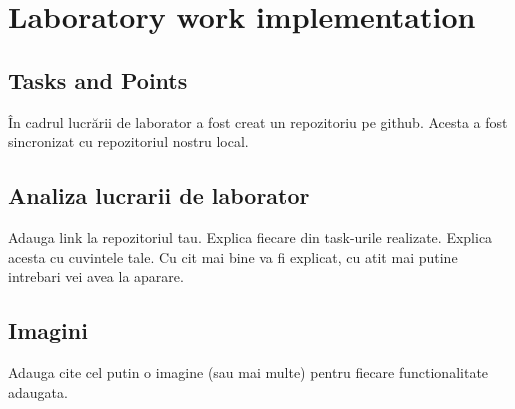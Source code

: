\section{Laboratory work implementation}

\subsection{Tasks and Points}

	În cadrul lucrării de laborator a fost creat un repozitoriu pe github. Acesta a fost sincronizat cu repozitoriul nostru local. 
\subsection{Analiza lucrarii de laborator}

Adauga link la repozitoriul tau.
Explica fiecare din task-urile realizate. Explica acesta cu cuvintele tale. Cu cit mai bine va fi explicat,
cu atit mai putine intrebari vei avea la aparare.

\subsection{Imagini}

Adauga cite cel putin o imagine (sau mai multe) pentru fiecare functionalitate adaugata.

\clearpage